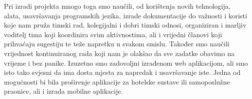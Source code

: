 		Pri izradi projekta mnogo toga smo naučili, od korištenja novih tehnologija,
		alata, usavršavanja programskih jezika, izrade dokumentacije
		do važnosti i koristi koje nam pruža timski rad, kolegijalni i dobri
		timski odnosi, organiziran i marljiv voditelj tima koji koordinira
		svim aktivnostima, ali i vrijedni članovi
		koji prihvaćaju sugestiju te teže napretku u svakom smislu.
		Također smo naučili vrijednost kontinuiranog rada koji nam je olakšao
		da sve zadatke obavimo na vrijeme i bez panike. Izuzetno smo zadovoljni
		izrađenom web aplikacijom, ali smo isto tako svjesni da ima dosta mjesta
		za napredak i usavršavanje iste. Jedna od mogućnosti bi bila proširenje 
		aplikacije za hotelske sustave ili samoposlužne praonice, ali i izrada mobilne 
		aplikacije.
		\eject 